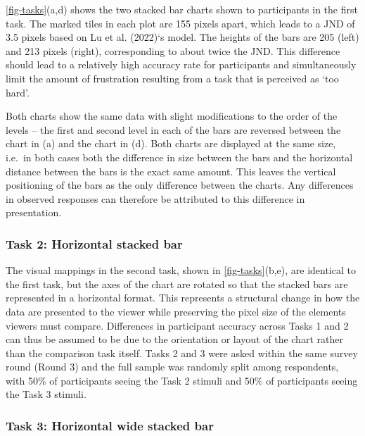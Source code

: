\documentclass[
]{jds}
\begin{document}
\autoref{fig-tasks}(a,d) shows the two stacked bar charts shown to
participants in the first task. The marked tiles in each plot are 155
pixels apart, which leads to a JND of 3.5 pixels based on Lu et al.
(2022)`s model. The heights of the bars are 205 (left) and 213 pixels
(right), corresponding to about twice the JND. This difference should
lead to a relatively high accuracy rate for participants and
simultaneously limit the amount of frustration resulting from a task
that is perceived as `too hard'.

Both charts show the same data with slight modifications to the order of
the levels -- the first and second level in each of the bars are
reversed between the chart in (a) and the chart in (d). Both charts are
displayed at the same size, i.e.~in both cases both the difference in
size between the bars and the horizontal distance between the bars is
the exact same amount. This leaves the vertical positioning of the bars
as the only difference between the charts. Any differences in observed
responses can therefore be attributed to this difference in
presentation.

\hypertarget{task-2-horizontal-stacked-bar}{%
\subsubsection{Task 2: Horizontal stacked
bar}\label{task-2-horizontal-stacked-bar}}

The visual mappings in the second task, shown in
\autoref{fig-tasks}(b,e), are identical to the first task, but the axes
of the chart are rotated so that the stacked bars are represented in a
horizontal format. This represents a structural change in how the data
are presented to the viewer while preserving the pixel size of the
elements viewers must compare. Differences in participant accuracy
across Tasks 1 and 2 can thus be assumed to be due to the orientation or
layout of the chart rather than the comparison task itself. Tasks 2 and
3 were asked within the same survey round (Round 3) and the full sample
was randomly split among respondents, with 50\% of participants seeing
the Task 2 stimuli and 50\% of participants seeing the Task 3 stimuli.

\hypertarget{task-3-horizontal-wide-stacked-bar}{%
\subsubsection{Task 3: Horizontal wide stacked
bar}\label{task-3-horizontal-wide-stacked-bar}}
\end{document}

